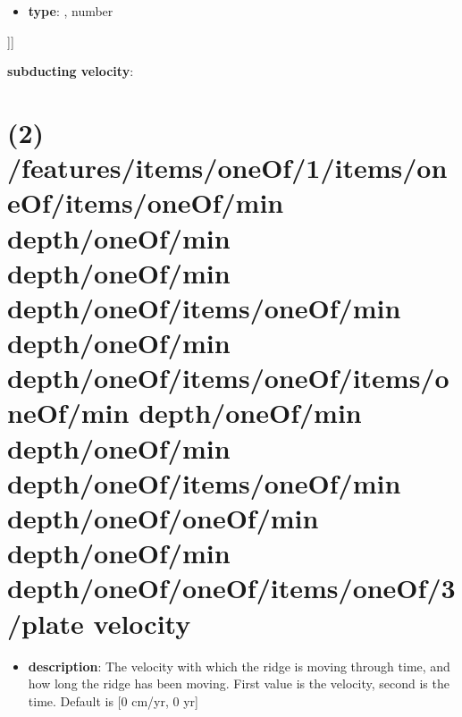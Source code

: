 \begin{itemize}[leftmargin=7em]\item {\bf type}: , number\end{itemize}]]\item {\bf subducting velocity}: \section{(2) /features/items/oneOf/1/items/oneOf/items/oneOf/min depth/oneOf/min depth/oneOf/min depth/oneOf/items/oneOf/min depth/oneOf/min depth/oneOf/items/oneOf/items/oneOf/min depth/oneOf/min depth/oneOf/min depth/oneOf/items/oneOf/min depth/oneOf/oneOf/min depth/oneOf/min depth/oneOf/oneOf/items/oneOf/3/plate velocity}
\begin{itemize}[leftmargin=2em]\item {\bf description}: The velocity with which the ridge is moving through time, and how long the ridge has been moving. First value is the velocity, second is the time. Default is [0 cm/yr, 0 yr]
\end{itemize}
